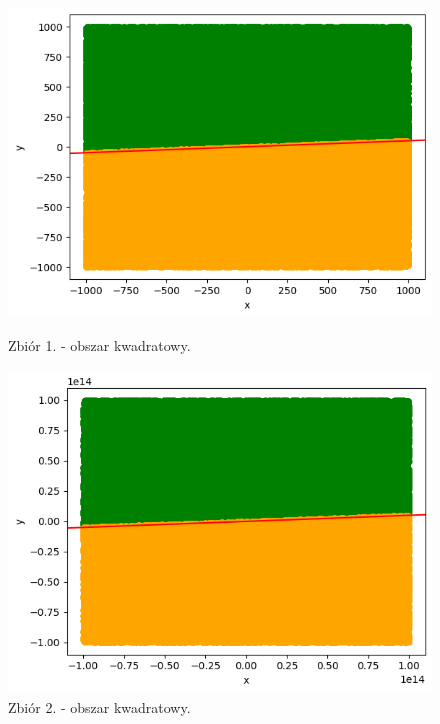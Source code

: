 \documentclass[11pt]{scrartcl}
\begin{document}
    \begin{figure}[H]
        \centering
        \begin{minipage}{0.4\linewidth}
          \centering
          \includegraphics[width=1\linewidth]{1_5.png}
          \caption{Zbiór 1. - obszar kwadratowy.}
        \end{minipage}
        \begin{minipage}{0.4\linewidth}
          \centering
          \includegraphics[width=1\linewidth]{1_6.png}
          \caption{Zbiór 2. - obszar kwadratowy.}
        \end{minipage}
    \end{figure}
\end{document}
